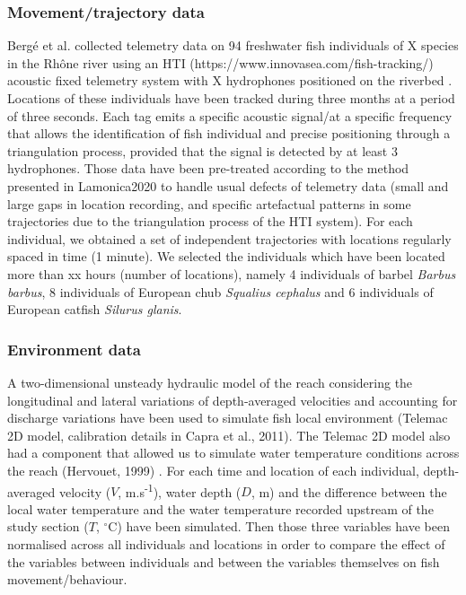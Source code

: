 \documentclass{article}
\begin{document}
\begin{linenumbers}
\subsubsection{Movement/trajectory data}
Berg\'e et al. collected telemetry data on 94 freshwater fish individuals of X species in the Rh\^one river using an HTI (https://www.innovasea.com/fish-tracking/) acoustic fixed telemetry system with X hydrophones positioned on the riverbed \cite{Berge2012}. Locations of these individuals have been tracked during three months at a period of three seconds. Each tag emits a specific acoustic signal/at a specific frequency that allows the identification of fish individual and precise positioning through a triangulation process, provided that the signal is detected by at least 3 hydrophones. Those data have been pre-treated according to the method presented in Lamonica2020 to handle usual defects of telemetry data (small and large gaps in location recording, and specific artefactual patterns in some trajectories due to the triangulation process of the HTI system). For each individual, we obtained a set of independent trajectories with locations regularly spaced in time (1 minute). We selected the individuals which have been located more than xx hours (number of locations), namely 4 individuals of barbel \textit{Barbus barbus}, 8 individuals of European chub \textit{Squalius cephalus} and 6 individuals of European catfish \textit{Silurus glanis}.


\subsubsection{Environment data}
A two-dimensional unsteady hydraulic model of the reach considering the longitudinal and lateral variations of depth-averaged velocities and accounting for discharge variations have been used to simulate fish local environment (Telemac 2D model, calibration details in Capra et al., 2011). The Telemac 2D model also had a component that allowed us to simulate water temperature conditions across the reach (Hervouet, 1999) %
. For each time and location of each individual, depth-averaged velocity ($V$, m.s\textsuperscript{-1}), water depth ($D$, m) and the difference between the local water temperature and the water temperature recorded upstream of the study section ($T$, $^{\circ}$C) have been simulated. Then those three variables have been normalised across all individuals and locations in order to compare the effect of the variables between individuals and between the variables themselves on fish movement/behaviour.


\end{linenumbers}
\end{document}
